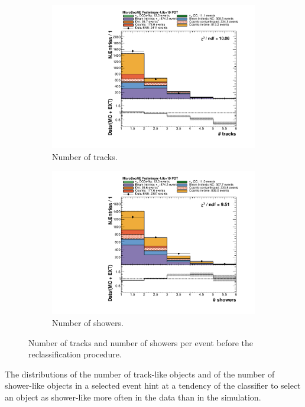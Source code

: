 \begin{figure}[htbp]
\centering
  \begin{subfigure}{0.45\textwidth}
    \includegraphics[width=\linewidth]{figures/h_n_tracks_before.pdf}
    \caption{Number of tracks.} 
  \end{subfigure}
    \begin{subfigure}{0.45\textwidth}
    \includegraphics[width=\linewidth]{figures/h_n_showers_before.pdf}
    \caption{Number of showers.} 
  \end{subfigure}
  \caption{Number of tracks and number of showers per event before the reclassification procedure.}\label{fig:nshowers}
\end{figure}

The distributions of the number of track-like objects and of the number of shower-like objects in a selected event hint at a tendency of the classifier to select an object as shower-like more often in the data than in the simulation.

